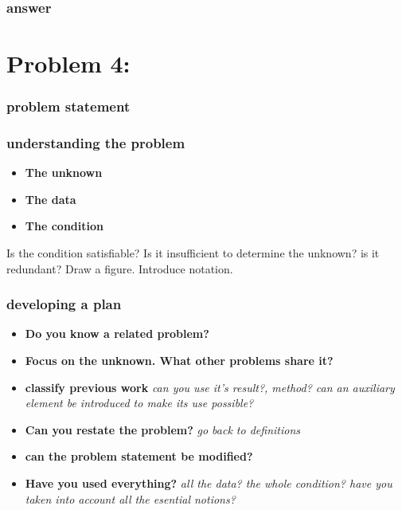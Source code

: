 \documentclass[11pt]{article}
\begin{document}
\subsubsection*{answer}

\section*{Problem 4:}

\subsubsection*{problem statement}

\subsubsection*{understanding the problem}

\begin{itemize}
 \item \textbf{The unknown}
 \item \textbf{The data} 
 \item \textbf{The condition} 
\end{itemize}

Is the condition satisfiable? Is it insufficient to determine the unknown? is it redundant?
Draw a figure. Introduce notation.

\subsubsection*{developing a plan}

\begin{itemize}
 \item \textbf{Do you know a related problem?}
 \item \textbf{Focus on the unknown. What other problems share it?}
 \item \textbf{classify previous work} \textit{can you use it's result?, method? can an auxiliary element be introduced to make its use possible?}
 \item \textbf{Can you restate the problem?} \textit{go back to definitions}
 \item \textbf{can the problem statement be modified?}
 \item \textbf{Have you used everything?} \textit{all the data? the whole condition? have you taken into account all the esential notions?}
\end{itemize}
\end{document}
